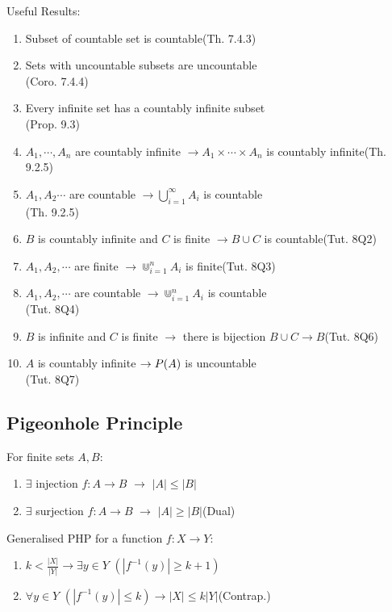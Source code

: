\documentclass[12pt, a4paper]{article}
\begin{document}
\begin{multicols*}{3}
Useful Results:
\begin{enumerate}[\roman*.]
  \item Subset of countable set is countable\hfill(Th. 7.4.3)
  \item Sets with uncountable subsets are uncountable\\\hfill(Coro. 7.4.4)
  \item Every infinite set has a countably infinite subset\\\hfill(Prop. 9.3)
  \item $A_1,\cdots,A_n$ are countably infinite $\rightarrow A_1\times\cdots\times A_n$ is countably infinite\hfill(Th. 9.2.5)
  \item $A_1,A_2\cdots$ are countable $\rightarrow \bigcup^{\infty}_{i=1}A_i$ is countable\\\hfill(Th. 9.2.5)
  \item $B$ is countably infinite and $C$ is finite $\rightarrow B\cup C$ is countable\hfill(Tut. 8Q2)
  \item $A_1, A_2,\cdots$ are finite $\rightarrow \Cup^n_{i=1}A_i$ is finite\hfill(Tut. 8Q3)
  \item $A_1, A_2,\cdots$ are countable $\rightarrow \Cup^n_{i=1}A_i$ is countable\\\hfill(Tut. 8Q4)
  \item $B$ is infinite and $C$ is finite $\rightarrow$ there is bijection $B\cup C \rightarrow B$\hfill(Tut. 8Q6)
  \item $A$ is countably infinite $\rightarrow \powerset(A)$ is uncountable\\\hfill(Tut. 8Q7)
\end{enumerate}
\colbreak
\subsection{Pigeonhole Principle}

For finite sets $A,B$:
\begin{enumerate}[\roman*.]
  \item $\exists$ injection $f:A\rightarrow B$ $\rightarrow$ $|A|\leq|B|$
  \item $\exists$ surjection $f:A\rightarrow B$ $\rightarrow$ $|A|\geq|B|$\hfill(Dual)
\end{enumerate}

Generalised PHP for a function $f: X\rightarrow Y$:
\begin{enumerate}[\roman*.]
  \item $k < \frac{|X|}{|Y|}\rightarrow\exists y\in Y$ $(|f^{-1}({y})|\geq k+1)$
  \item $\forall y\in Y$ $(|f^{-1}({y})|\leq k) \rightarrow |X| \leq k|Y|$\hfill(Contrap.)
\end{enumerate}


\end{multicols*}
\end{document}
